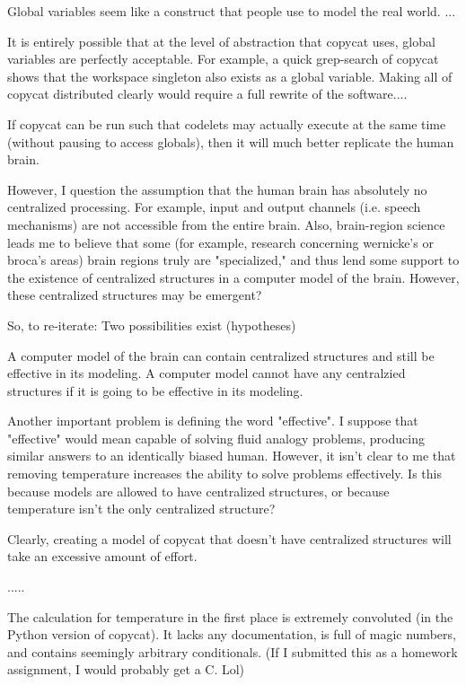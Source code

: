 \documentclass[a4paper]{article}
\begin{document}
    Global variables seem like a construct that people use to model the real world.
    ...

    It is entirely possible that at the level of abstraction that copycat uses, global variables are perfectly acceptable.
    For example, a quick grep-search of copycat shows that the workspace singleton also exists as a global variable.
    Making all of copycat distributed clearly would require a full rewrite of the software....

    If copycat can be run such that codelets may actually execute at the same time (without pausing to access globals), then it will much better replicate the human brain.

    However, I question the assumption that the human brain has absolutely no centralized processing.
    For example, input and output channels (i.e. speech mechanisms) are not accessible from the entire brain.
    Also, brain-region science leads me to believe that some (for example, research concerning wernicke's or broca's areas) brain regions truly are "specialized," and thus lend some support to the existence of centralized structures in a computer model of the brain.
    However, these centralized structures may be emergent?

    So, to re-iterate: Two possibilities exist (hypotheses)

    A computer model of the brain can contain centralized structures and still be effective in its modeling.
    A computer model cannot have any centralzied structures if it is going to be effective in its modeling.

    Another important problem is defining the word "effective".
    I suppose that "effective" would mean capable of solving fluid analogy problems, producing similar answers to an identically biased human.
    However, it isn't clear to me that removing temperature increases the ability to solve problems effectively.
    Is this because models are allowed to have centralized structures, or because temperature isn't the only centralized structure?

    Clearly, creating a model of copycat that doesn't have centralized structures will take an excessive amount of effort.

    \break
    .....
    \break

    The calculation for temperature in the first place is extremely convoluted (in the Python version of copycat).
    It lacks any documentation, is full of magic numbers, and contains seemingly arbitrary conditionals. 
    (If I submitted this as a homework assignment, I would probably get a C. Lol)
\end{document}
